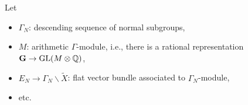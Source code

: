 \documentclass[reqno]{amsart} 
\begin{document}
Let
\begin{itemize}
\item $\Gamma_N$: descending sequence of normal subgroups,
\item $M$: arithmetic $\Gamma$-module, i.e., there is a rational representation $\mathbf{G} \rightarrow \operatorname{GL} (M \otimes \mathbb{Q})$,
\item $E_N \rightarrow \Gamma_N \backslash \tilde{X}$: flat vector bundle associated to $\Gamma_N $-module,
\item etc.
\end{itemize}

{} 
\end{document}
